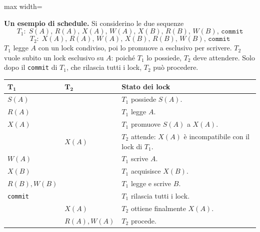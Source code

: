\documentclass[12pt]{extarticle}
\begin{document}
\begin{center}
\begin{adjustbox}{max width=\linewidth}
\end{adjustbox}
\end{center}

\medskip
\noindent \textbf{Un esempio di schedule.} Si considerino le due sequenze
\[
T_1:\; S(A),\, R(A),\, X(A),\, W(A),\, X(B),\, R(B),\, W(B),\, \texttt{commit}
\]
\[
T_2:\; X(A),\, R(A),\, W(A),\, X(B),\, R(B),\, W(B),\, \texttt{commit}
\]
$T_1$ legge $A$ con un lock condiviso, poi lo promuove a esclusivo per scrivere. $T_2$ vuole subito un lock esclusivo su $A$: poiché $T_1$ lo possiede, $T_2$ deve attendere. Solo dopo il \texttt{commit} di $T_1$, che rilascia tutti i lock, $T_2$ può procedere.

\begin{center}
\small
\begin{tabular}{@{}llp{7.2cm}@{}}
    \toprule
    $\boldsymbol{T_1}$ & $\boldsymbol{T_2}$ & \textbf{Stato dei lock} \\
    \midrule
    $S(A)$ &  & $T_1$ possiede $S(A)$. \\
    $R(A)$ &  & $T_1$ legge $A$. \\
    $X(A)$ &  & $T_1$ promuove $S(A)$ a $X(A)$. \\
     & $X(A)$ & $T_2$ attende: $X(A)$ è incompatibile con il lock di $T_1$. \\
    $W(A)$ &  & $T_1$ scrive $A$. \\
    $X(B)$ &  & $T_1$ acquisisce $X(B)$. \\
    $R(B), W(B)$ &  & $T_1$ legge e scrive $B$. \\
    \texttt{commit} &  & $T_1$ rilascia tutti i lock. \\
     & $X(A)$ & $T_2$ ottiene finalmente $X(A)$. \\
     & $R(A), W(A)$ & $T_2$ procede. \\
    \bottomrule
\end{tabular}
\end{center}
\end{document}
